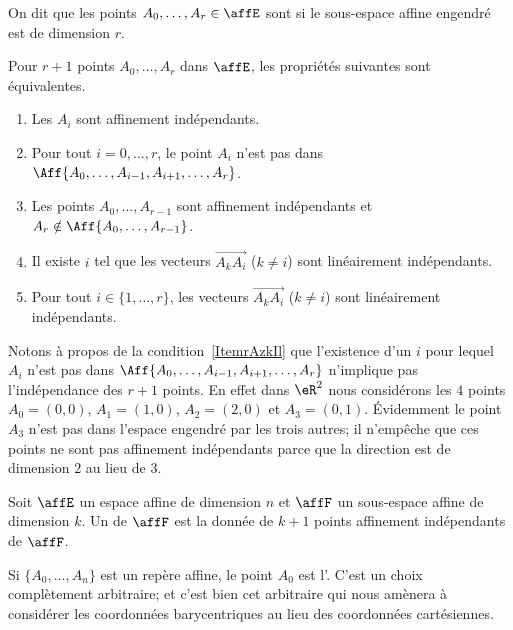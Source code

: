 \begin{definition}
	On dit que les points \( A_0,\ldots, A_r\in \affE\) sont  si le sous-espace affine engendré est de dimension \( r\).
\end{definition}

\begin{proposition}  \label{PropGAneHg}
	Pour \( r+1\) points \( A_0,\ldots, A_r\) dans \( \affE\), les propriétés suivantes sont équivalentes.
	\begin{enumerate}
		\item
		      Les \( A_i\) sont affinement indépendants.
		\item
		      Pour tout \( i=0,\ldots, r\), le point \( A_i\) n'est pas dans \( \Aff\{ A_0,\ldots, A_{i-1}, A_{i+1},\ldots, A_r \}\).
		      \item\label{ItemrAzkIl}
		      Les points \( A_0,\ldots, A_{r-1}\) sont affinement indépendants et \( A_r\notin\Aff\{ A_0,\ldots, A_{r-1} \}\).
		\item
		      Il existe \( i\) tel que les vecteurs \( \overrightarrow{ A_kA_i }\) (\( k\neq i\)) sont linéairement indépendants.
		      \item\label{ItemFBfcuq}
		      Pour tout \( i\in\{ 1,\ldots, r \}\), les vecteurs \( \overrightarrow{ A_kA_i }\) (\( k\neq i\)) sont linéairement indépendants.
	\end{enumerate}
\end{proposition}

Notons à propos de la condition~\ref{ItemrAzkIl} que l'existence d'un \( i\) pour lequel \( A_i\) n'est pas dans \(\Aff\{ A_0,\ldots, A_{i-1},A_{i+1},\ldots, A_r \}\) n'implique pas l'indépendance des \( r+1\) points. En effet dans \( \eR^2\) nous considérons les \( 4\) points \( A_0=(0,0)\), \( A_1=(1,0)\), \( A_2=(2,0)\) et \( A_3=(0,1)\). Évidemment le point \( A_3\) n'est pas dans l'espace engendré par les trois autres; il n'empêche que ces points ne sont pas affinement indépendants parce que la direction est de dimension \( 2\) au lieu de \( 3\).

\begin{definition}  \label{DefguuwEO}
	Soit \( \affE\) un espace affine de dimension \( n\) et \( \affF\) un sous-espace affine de dimension \( k\). Un  de \( \affF\) est la donnée de \( k+1\) points affinement indépendants de \( \affF\).
\end{definition}
Si \( \{ A_0,\ldots, A_n \}\) est un repère affine, le point \( A_0\) est l'. C'est un choix complètement arbitraire; et c'est bien cet arbitraire qui nous amènera à considérer les coordonnées barycentriques au lieu des coordonnées cartésiennes.

